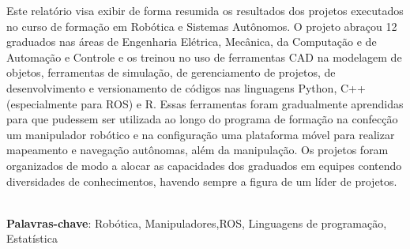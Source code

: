 \begin{thesisresumo}

  Este relatório visa exibir de forma resumida os resultados dos projetos executados no curso de formação em Robótica e Sistemas Autônomos. O projeto abraçou 12 graduados nas áreas de Engenharia Elétrica, Mecânica, da Computação e de Automação e Controle e os treinou no uso de ferramentas CAD na modelagem de objetos, ferramentas de simulação, de gerenciamento de projetos, de desenvolvimento e versionamento de códigos nas linguagens Python, C++ (especialmente para ROS) e R. Essas ferramentas foram gradualmente aprendidas para que pudessem ser utilizada ao longo do programa de formação na confecção um manipulador robótico e na configuração uma plataforma móvel para realizar mapeamento e navegação autônomas, além da manipulação. Os projetos foram organizados de modo a alocar as capacidades dos graduados em equipes contendo diversidades de conhecimentos, havendo sempre a figura de um líder de projetos.

\ \\


\textbf{Palavras-chave}: Robótica, Manipuladores,ROS, Linguagens de programação, Estatística

\end{thesisresumo}